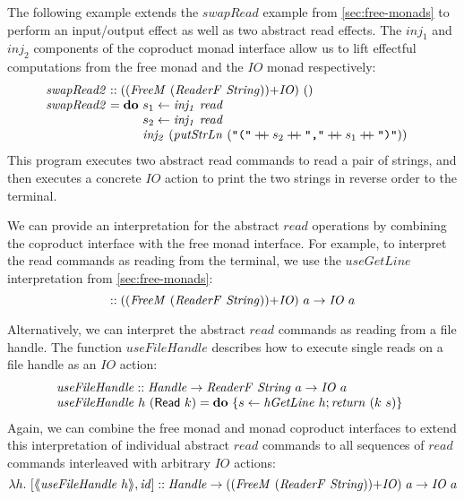 \documentclass{jfp1}
\newcommand{\fmext}[1]{\langle\kern-0.25em\langle #1 \rangle\kern-0.25em\rangle}
\newcommand{\kw}[1]{\textbf{#1}}
\begin{document}
The following example extends the $\mathit{swapRead}$ example from
\autoref{sec:free-monads} to perform an input/output effect as well as
two abstract read effects.  The $\mathit{inj_1}$ and $\mathit{inj_2}$
components of the coproduct monad interface allow us to lift effectful
computations from the free monad and the $\mathit{IO}$ monad respectively:
\begin{displaymath}
  \begin{array}{@{}l}
    \mathit{swapRead2} :: (\cprd{(\mathit{FreeM}~(\mathit{ReaderF}~\mathit{String}))}{\mathit{IO}})~() \\
    \mathit{swapRead2} = \kw{do}~
    \begin{array}[t]{@{}l}
      s_1 \leftarrow \mathit{inj_1}~\mathit{read} \\
      s_2 \leftarrow \mathit{inj_1}~\mathit{read} \\
      \mathit{inj_2}~(\mathit{putStrLn}~(\texttt{"("} \dplus s_2 \dplus \texttt{","} \dplus s_1 \dplus \texttt{")"}))
    \end{array}
  \end{array}
\end{displaymath}
This program executes two abstract read commands to read a pair of
strings, and then executes a concrete $\mathit{IO}$ action to print
the two strings in reverse order to the terminal.

We can provide an interpretation for the abstract $\mathit{read}$
operations by combining the coproduct interface with the free monad
interface. For example, to interpret the read commands as reading from
the terminal, we use the $\mathit{useGetLine}$ interpretation from
\autoref{sec:free-monads}:
\begin{displaymath}
  [\fmext{\mathit{useGetLine}}, \mathit{id}] :: (\cprd{(\mathit{FreeM}~(\mathit{ReaderF}~\mathit{String}))}{\mathit{IO}})~a \to \mathit{IO}~a
\end{displaymath}

Alternatively, we can interpret the abstract $\mathit{read}$ commands
as reading from a file handle. The function $\mathit{useFileHandle}$
describes how to execute single reads on a file handle as an $\mathit{IO}$ action:
\begin{displaymath}
  \begin{array}{@{}l}
    \mathit{useFileHandle} :: \mathit{Handle} \to \mathit{ReaderF}~\mathit{String}~a \to \mathit{IO}~a \\
    \mathit{useFileHandle}~h~(\mathsf{Read}~k) = \kw{do}~\{ s \leftarrow \mathit{hGetLine}~h; \mathit{return}~(k~s) \}
  \end{array}
\end{displaymath}
Again, we can combine the free monad and monad coproduct interfaces to
extend this interpretation of individual abstract $\mathit{read}$
commands to all sequences of $\mathit{read}$ commands interleaved with
arbitrary $\mathit{IO}$ actions:
\begin{displaymath}
  \lambda h.~[\fmext{\mathit{useFileHandle}~h}, \mathit{id}] :: \mathit{Handle} \to (\cprd{(\mathit{FreeM}~(\mathit{ReaderF}~\mathit{String}))}{\mathit{IO}})~a \to \mathit{IO}~a
\end{displaymath}
\end{document}
